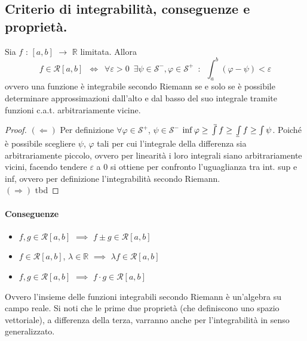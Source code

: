 \documentclass[10pt]{article}
\theoremstyle{plain}
\def\upint{\mathchoice%
    {\mkern13mu\overline{\vphantom{\intop}\mkern7mu}\mkern-20mu}%
    {\mkern7mu\overline{\vphantom{\intop}\mkern7mu}\mkern-14mu}%
    {\mkern7mu\overline{\vphantom{\intop}\mkern7mu}\mkern-14mu}%
    {\mkern7mu\overline{\vphantom{\intop}\mkern7mu}\mkern-14mu}%
  \int}
\def\lowint{\mkern3mu\underline{\vphantom{\intop}\mkern7mu}\mkern-10mu\int}
\begin{document}
\subsection{Criterio di integrabilità, conseguenze e proprietà.}
\begin{prop}
    Sia $f$ : $[a,b]$ $\rightarrow$ $\mathbb{R}$  limitata. Allora
    \[f \in \mathcal{R}[a,b] \enspace \Leftrightarrow \enspace \forall \varepsilon > 0 \enspace \exists \psi \in \mathcal{S}^- , \varphi \in \mathcal{S}^+ \enspace : \enspace \int_a^b (\varphi - \psi) < \varepsilon\]
    ovvero una funzione è integrabile secondo Riemann se e solo se è possibile determinare approssimazioni dall'alto e dal basso del suo integrale tramite funzioni c.a.t. arbitrariamente vicine.
\end{prop}
\begin{proof}
    $(\Leftarrow)$ Per definizione $\forall \varphi \in  \mathcal{S}^+$, $\psi \in  \mathcal{S}^-$ $\inf \varphi \geq \upint f \geq \lowint f \geq \int \psi$. Poiché è possibile scegliere $\psi$, $\varphi$ tali per cui l'integrale della differenza sia arbitrariamente piccolo, ovvero per linearità i loro integrali siano arbitrariamente vicini, facendo tendere $\varepsilon$ a 0 si ottiene per confronto l'uguaglianza tra int. sup e inf, ovvero per definizione l'integrabilità secondo Riemann.
    \\$(\Rightarrow)$ tbd
\end{proof}

\paragraph*{Conseguenze}
\begin{itemize}[label=$\ast$]
    \item $f, g \in \mathcal{R}[a,b] $ $\implies$ $f \pm g \in \mathcal{R}[a,b] $
    \item $f \in \mathcal{R}[a,b] $, $\lambda \in \mathbb{R}$ $\implies$ $\lambda f \in \mathcal{R}[a,b] $
    \item  $f, g \in \mathcal{R}[a,b] $ $\implies$ $f \cdot g \in \mathcal{R}[a,b] $
\end{itemize}

Ovvero l'insieme delle funzioni integrabili secondo Riemann è un'algebra su campo reale. Si noti che le prime due proprietà (che definiscono uno spazio vettoriale), a differenza della terza, varranno anche per l'integrabilità in senso generalizzato.
\end{document}

